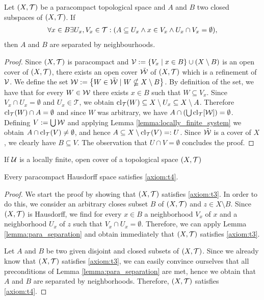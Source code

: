 \begin{lemma} \label{lemma:para_separation} \cite[p. 71]{Top}
	Let $\tspace$ be a paracompact topological space and $A$ and $B$ two closed subspaces of $\tspace$. If 
	\begin{align*}
	\forall x \in B\exists U_x, V_x \in \mathcal{T}: \pbraces{A \subseteq U_x \land x \in V_x \land U_x \cap V_x = \emptyset},
	\end{align*}
	then $A$ and $B$ are separated by neighbourhoods. 
\end{lemma}
\begin{proof}
	Since $\tspace$ is paracompact and $\cover[V] := \Bbraces{V_x \mid x \in B} \cup \pbraces{X \setminus B}$ is an open cover of $\tspace$, there exists an open cover $\tilde{\cover[W]}$ of $\tspace$ which is a refinement  of $\cover[V]$. We define the set $\cover[W] := \Bbraces{W \in \tilde{\cover[W]} \mid W \nsubseteq X \setminus B}$. By definition of the set, we have that for every $W \in \cover[W]$ there exists $x \in B$ such that $W \subseteq V_x$. Since $V_x \cap U_x = \emptyset$ and $U_x \in \mathcal{T}$, we obtain $\cl{W} \subseteq X \setminus U_x \subseteq X \setminus A$. Therefore $\cl{W} \cap A = \emptyset$ and since $W$ was arbitrary, we have $A \cap \pbraces{\bigcup \clo{\cover[W]}} = \emptyset$. Defining $V := \bigcup \cover[W]$ and applying Lemma \ref{lemma:locally_finite_system} we obtain $A  \cap \cl{V} \neq \emptyset$, and hence $A \subseteq X \setminus \cl{V} =: U$. Since $\tilde{\cover[W]}$ is a cover of $X$, we clearly have $B \subseteq V$. The observation that $U \cap V = \emptyset$ concludes the proof. 
	
	
\end{proof}

\begin{lemma}
	If $\cover$ is a locally finite, open cover of a topological space $\tspace$ 
\end{lemma}

\begin{corollary} \label{corollary:para_is_normal} \cite[p. 72]{Top}
	Every paracompact Hausdorff space satisfies \ref{axiom:t4}. 
\end{corollary}
\begin{proof}
	We start the proof by showing that $\tspace$ satisfies \ref{axiom:t3}. In order to do this, we consider an arbitrary closes subset $B$ of $\tspace$ and $z \in X \setminus B$. Since $\tspace$ is Hausdorff, we find for every $x \in B$ a neighborhood $V_x$ of $x$ and a neighborhood $U_x$ of $z$ such that $V_x \cap U_x = \emptyset$. Therefore, we can apply Lemma \ref{lemma:para_separation} and obtain immediately that $\tspace$ satisfies \ref{axiom:t3}. 
	
	Let $A$ and $B$ be two given disjoint and closed subsets of $\tspace$. Since we already know that $\tspace$ satisfies \ref{axiom:t3}, we can easily convince ourselves that all preconditions of Lemma \ref{lemma:para_separation} are met, hence we obtain that $A$ and $B$ are separated by neighborhoods. Therefore, $\tspace$ satisfies \ref{axiom:t4}. 
\end{proof}

